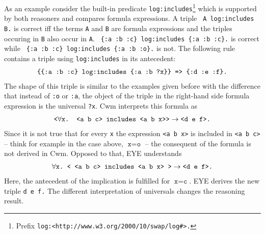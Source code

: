 As an example consider the built-in predicate \texttt{log:includes}\footnote{Prefix \texttt{log:<http://www.w3.org/2000/10/swap/log\#>.}} %
which is supported by both reasoners and compares formula expressions. A triple \texttt{ A log:includes B.} is correct
iff the terms \texttt{A} and \texttt{B} are formula expressions and the triples occuring in \texttt{B} also occur in \texttt{A}. \texttt{ \{:a :b :c\} log:includes \{:a :b :c\}.} 
is correct 
while \texttt{ \{:a :b :c\} log:includes \{:a :b :o\}.}
is not.  %
The following rule contains a triple using \texttt{log:includes} in its antecedent: 
\begin{multline}\notag
 \texttt{\{\{:a :b :c\} log:includes \{:a :b ?x\}\}}
   \texttt{ => \{:d :e :f\}.} 
\end{multline}
The shape of this triple is similar to the examples 
given before with the difference that instead of \texttt{:o} or \texttt{:a}, the object of the triple in the right-hand side formula expression is the universal \texttt{?x}. 
Cwm interprets this formula as
\begin{multline}\notag
 \texttt{<}\forall \texttt{x. <a b c> includes <a b x>{}>} \rightarrow\texttt{<d e f>.}
\end{multline}
Since it is not true that for every \texttt{x} the expression \texttt{<a~b~x>} is included in \texttt{<a b c>} -- think 
for example in the case above, $\texttt{x}=\texttt{o}$ -- %
the consequent of the formula is not derived in Cwm. Opposed to that, EYE understands
\begin{multline}\notag
 \forall \texttt{x.}\texttt{ <{} <a b c> includes <a b x> {}>} \rightarrow \texttt{<d e f>.}
\end{multline}
Here, the antecedent of the implication is fulfilled for $\texttt{x}=\texttt{c}$. EYE derives the new triple \texttt{d~e~f.} 
The different interpretation of universals changes the reasoning result.



